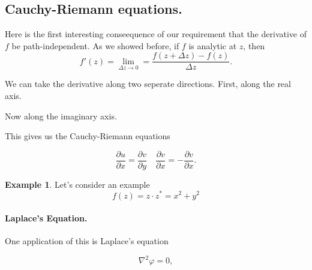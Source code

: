 \documentclass[12pt]{article}
\newcommand{\pdiff}[2]{\frac{\partial #1}{\partial #2}}
\renewcommand{\phi}{\varphi}
\theoremstyle{definition}
\newtheorem{exmp}[thm]{Example}
\theoremstyle{remark}
\numberwithin{equation}{section}
\begin{document}

\subsection{Cauchy-Riemann equations.}%
\label{sub:cauchy_riemann_equations}

Here is the first interesting conseequence of our requirement that the derivative of $f$ be path-independent. As we showed before, if $f$ is analytic at $z$, then
\begin{equation}
  f'(z) = \lim_{\Delta z \to 0} = \frac{f(z + \Delta z) - f(z)}{\Delta z}.
\end{equation}

We can take the derivative along two seperate directions. First, along the real axis.


Now along the imaginary axis.


This gives us the Cauchy-Riemann equations

\begin{equation}
  \pdiff{u}{x} =\pdiff{v}{y} \quad \pdiff{v}{x} = - \pdiff{v}{x}.
\end{equation}

\begin{exmp}
Let's consider an example
\begin{equation}
  f(z) = z \cdot z^* = x^2 + y^2
\end{equation}
\end{exmp}



\paragraph{Laplace's Equation.}%
\label{par:laplaces_equation}

One application of this is Laplace's equation

\begin{equation}
  \nabla^2 \phi = 0,
\end{equation}
\end{document}
